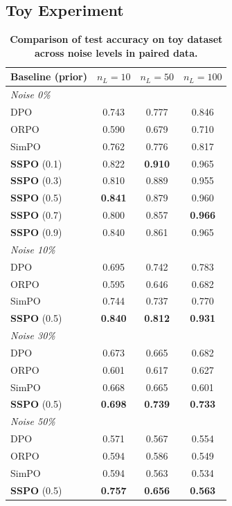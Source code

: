 \documentclass{article} %
\begin{document}
\subsection{Toy Experiment}
\label{appendix:details_toy-data}
\begin{table} 
\small
\vspace{-13mm}
    \centering
    \setlength{\tabcolsep}{1.3mm}
    \caption{\textbf{Comparison of test accuracy on toy dataset across noise levels in paired data.}}
    \label{tab:full_toy_experimental_results}
    \begin{tabular}{lccc}
        \toprule
        \textbf{Baseline} (prior) & $n_L=10$ & $n_L=50$ & $n_L=100$ \\
        \midrule
        \multicolumn{4}{l}{\textit{Noise 0\%}} \\
        DPO                      & 0.743 & 0.777 & 0.846 \\
        ORPO                     & 0.590 & 0.679 & 0.710 \\
        SimPO                    & 0.762 & 0.776 & 0.817 \\
        \textbf{SSPO} (0.1)      & 0.822 & \textbf{0.910} & 0.965 \\
        \textbf{SSPO} (0.3)      & 0.810 & 0.889 & 0.955 \\
        \textbf{SSPO} (0.5)      & \textbf{0.841} & 0.879 & 0.960 \\
        \textbf{SSPO} (0.7)      & 0.800 & 0.857 & \textbf{0.966} \\
        \textbf{SSPO} (0.9)      & 0.840 & 0.861 & 0.965 \\
        \midrule
        \multicolumn{4}{l}{\textit{Noise 10\%}} \\
        DPO & 0.695 & 0.742 & 0.783 \\
        ORPO & 0.595 & 0.646 & 0.682 \\
        SimPO & 0.744 & 0.737 & 0.770 \\
        \textbf{SSPO} (0.5) & \textbf{0.840} & \textbf{0.812} & \textbf{0.931} \\
        \midrule
        \multicolumn{4}{l}{\textit{Noise 30\%}} \\
        DPO & 0.673 & 0.665 & 0.682 \\
        ORPO & 0.601 & 0.617 & 0.627 \\
        SimPO & 0.668 & 0.665 & 0.601 \\
        \textbf{SSPO} (0.5) & \textbf{0.698} & \textbf{0.739} & \textbf{0.733} \\
        \midrule
        \multicolumn{4}{l}{\textit{Noise 50\%}} \\
        DPO & 0.571 & 0.567 & 0.554 \\
        ORPO & 0.594 & 0.586 & 0.549 \\
        SimPO & 0.594 & 0.563 & 0.534 \\
        \textbf{SSPO} (0.5) & \textbf{0.757} & \textbf{0.656} & \textbf{0.563}  \\
        \bottomrule
    \end{tabular}
    \vspace{-4pt}
\vspace{15pt}
    

\end{table}
\end{document}
